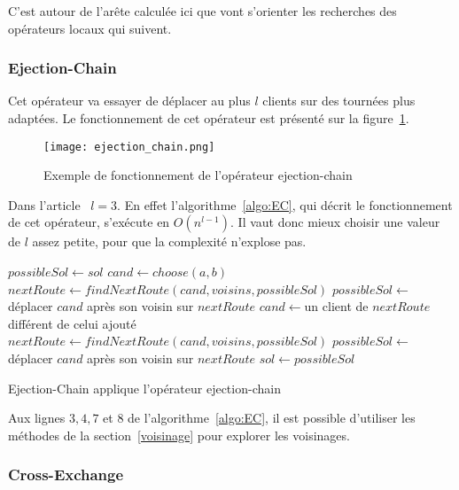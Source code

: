 \documentclass[a4paper,11pt]{article}%
\begin{document}
C'est autour de l'arête calculée ici que vont s'orienter les recherches des opérateurs locaux qui suivent.
 
\subsubsection{Ejection-Chain}

Cet opérateur va essayer de déplacer au plus $l$ clients sur des tournées plus adaptées. Le fonctionnement de cet opérateur est présenté sur la figure~\ref{EC}.

\begin{figure}
\centering
\texttt{[image: ejection\_chain.png]}
\caption{Exemple de fonctionnement de l'opérateur ejection-chain}
\label{EC}
\end{figure}

Dans l'article~\cite{Sorensen_2017} $l = 3$. En effet l'algorithme~\ref{algo:EC}, qui décrit le fonctionnement de cet opérateur, s'exécute en $O(n^{l-1})$. Il vaut donc mieux choisir une valeur de $l$ assez petite, pour que la complexité n'explose pas. 

\begin{algorithm}
\DontPrintSemicolon %
$possibleSol \gets sol$\;
$cand \gets choose(a,b)$\;
$nextRoute \gets findNextRoute(cand,voisins,possibleSol)$\;
$possibleSol \gets $ déplacer $cand$ après son voisin sur $nextRoute$\;
 {
  $cand \gets $un client de $nextRoute$ différent de celui ajouté\;
  $nextRoute \gets findNextRoute(cand,voisins,possibleSol)$\;
  $possibleSol \gets$ déplacer $cand$ après son voisin sur $nextRoute$\;
}
 {
	$sol \gets possibleSol$\;
}
\;
\caption{{\sc Ejection-Chain} applique l'opérateur ejection-chain}
\label{algo:EC}
\end{algorithm}

Aux lignes $3, 4, 7$ et $8$ de l'algorithme~\ref{algo:EC}, il est possible d'utiliser les méthodes de la section~\ref{voisinage} pour explorer les voisinages.

\subsubsection{Cross-Exchange}
\end{document}
